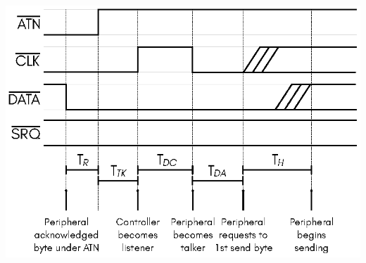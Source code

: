 \begin{center}
\includegraphics{images/IEC-Timing-Diagrams/IEC-Timing-Diagram-TurnAround}
\end{center}

